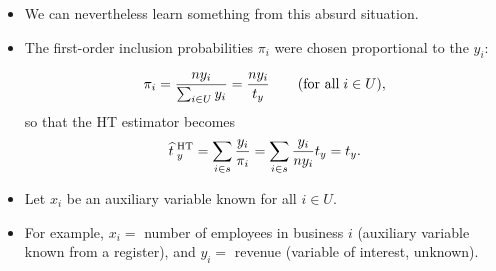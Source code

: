 \documentclass{my_eth_beamer}
\numberwithin{equation}{section}
\begin{document}
\begin{frame}
    \begin{Bsp_forts}[Cont.]
        \vspace{0.25em}
        \begin{itemize}
        \setlength{\itemsep}{2pt}
            \item We can nevertheless learn something from this \alert{absurd}
                situation.
            \item The first-order inclusion probabilities $\pi_i$ were chosen
                \alert{proportional} to the $y_i$:

                \vspace{-0.75em}

                \begin{equation*}
                    \pi_i = \frac{n y_i}{\sum_{i \in U} y_i} = \frac{n
                    y_i}{t_y} \qquad (\text{for all} \; i \in U),
                \end{equation*}
                \noindent so that the HT estimator becomes
                \begin{equation*}
                    \widehat{t}^{\;\mathrm{HT}}_{\;y} = \sum_{i \in s} \frac{y_i}{\pi_i} = \sum_{i
                    \in s} \frac{y_i}{n y_i} t_y = t_y.
                \end{equation*}
        \end{itemize}
    \end{Bsp_forts}
        \begin{itemize}
        \setlength{\itemsep}{6pt}
            \item Let $x_i$ be an \alert{auxiliary variable} known for
                \alert{all} $i\in U$.
            \item For example, $x_i=$ number of employees in business $i$
                (auxiliary variable known from a register), and $y_i=$ revenue
                (variable of interest, unknown).
        \end{itemize}
\end{frame}
\end{document}
